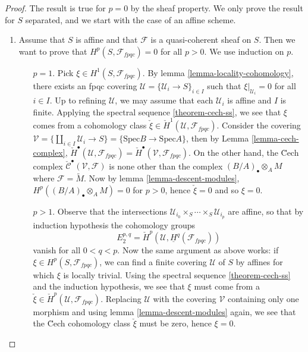 \begin{proof}
The result is true for $p=0$ by the sheaf property. We only prove the result
for $S$ separated, and we start with the case of an affine scheme.
\begin{enumerate}
\item
Assume that $S$ is affine and that $\mathcal{F}$ is a quasi-coherent sheaf on
$S$. Then we want to prove that $H^p(S, \mathcal{F}_{fpqc}) = 0$ for all $p>0$.
We use induction on $p$.
\begin{enumerate}
\item[$p=1$.]
Pick $\xi \in H^1(S, \mathcal{F}_{fpqc})$.
By lemma \ref{lemma-locality-cohomology},
there exists an fpqc covering
$\mathcal{U} = \{ \mathcal{U}_i \to S \}_{i \in I}$
such that $\xi|_{\mathcal{U}_i} = 0$ for all $i \in I$. Up to refining
$\mathcal{U}$, we may assume that each $\mathcal{U}_i$ is affine and $I$ is
finite. Applying the spectral sequence \ref{theorem-cech-ss},
we see that $\xi$ comes from a cohomology class $\check{\xi} \in \check
H^1(\mathcal{U}, \mathcal{F}_{fpqc})$. Consider the covering $\mathcal{V} = \{
\coprod_{i\in I} \mathcal{U}_i \to S\} = \{ \text{Spec} B \to \text{Spec} A
\}$, then by
Lemma \ref{lemma-cech-complex},
$\check H^\bullet(\mathcal{U}, \mathcal{F}_{fpqc}) =
\check H^\bullet(\mathcal{V}, \mathcal{F}_{fpqc})$.
On the other hand, the \u Cech complex
$\check{\mathcal{C}}^\bullet (\mathcal{V}, \mathcal{F})$
is none other than the complex $(B/A)_\bullet \otimes_A M$ where
$\mathcal{F} = \widetilde{M}$. Now by lemma \ref{lemma-descent-modules},
$H^p((B/A)_\bullet \otimes_A M) = 0$ for $p>0$, hence $\check{\xi} = 0$ and so
$\xi = 0$.
\item[$p>1$.]
Observe that the intersections $\mathcal{U}_{i_0} \times_S \cdots \times_S
\mathcal{U}_{i_p}$ are affine, so that by induction hypothesis the cohomology
groups
$$
E_2^{p,q} = \check H^p(\mathcal{U}, \underline{H}^q (\mathcal{F}_{fpqc}))
$$
vanish for all $0 < q < p$. Now the same argument as above works: if $\xi \in
H^p(S, \mathcal{F}_{fpqc})$, we can find a finite covering $\mathcal{U}$ of $S$
by affines for which $\xi$ is locally trivial. Using the spectral sequence
\ref{theorem-cech-ss} and the induction hypothesis, we see that
$\xi$ must come from a $\check{\xi} \in \check H^p(\mathcal{U},
\mathcal{F}_{fpqc})$. Replacing $\mathcal{U}$ with the covering $\mathcal{V}$
containing only one morphism and using lemma \ref{lemma-descent-modules} again,
we see that the \u Cech cohomology class $\check{\xi}$ must be zero, hence $\xi
= 0$.
\end{enumerate}

\end{enumerate}
\end{proof}
